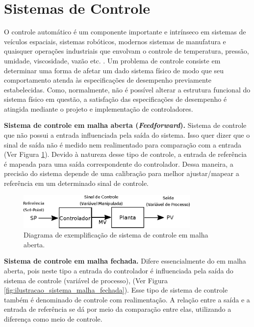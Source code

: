 \section{Sistemas de Controle}
\label{sec:sistema_controle}
O controle automático é um componente importante e intrínseco em sistemas de veículos espaciais, sistemas robóticos, modernos sistemas de manufatura e quaisquer operações industriais que envolvam o controle de temperatura, pressão, umidade, viscosidade, vazão etc. \cite{ogata2011engenharia}. Um problema de controle consiste em determinar uma forma de afetar um dado sistema físico de modo que seu comportamento atenda às especificações de desempenho previamente estabelecidas. Como, normalmente, não é possível alterar a estrutura funcional do sistema físico em questão, a satisfação das especificações de desempenho é atingida mediante o projeto e implementação de controladores.


\textbf{Sistema de controle em malha aberta (\emph{Feedforward}).} Sistema de controle que não possui a entrada influenciada pela saída do sistema. Isso quer dizer que o sinal de saída não é medido nem realimentado para comparação com a entrada (Ver Figura \ref{fig:ilustracao_sistema_malha_aberta}). Devido à natureza desse tipo de controle, a entrada de referência é mapeada para uma saída correspondente do controlador. Dessa maneira, a precisão do sistema depende de uma calibração para melhor ajustar/mapear a referência em um determinado sinal de controle.

\begin{figure}[H]
    \centering
    \includegraphics[width=0.8\textwidth]{figuras/ilustracoes/diagrama_sistema_malha_aberta.eps}
    \caption{Diagrama de exemplificação de sistema de controle em malha aberta.}
    \label{fig:ilustracao_sistema_malha_aberta}
\end{figure}

\textbf{Sistema de controle em malha fechada.} Difere essencialmente do em malha aberta, pois neste tipo a entrada do controlador é influenciada pela saída do sistema de controle (variável de processo), (Ver Figura \ref{fig:ilustracao_sistema_malha_fechada}). Esse tipo de sistema de controle também é denominado de controle com realimentação. A relação entre a saída e a entrada de referência se dá por meio da comparação entre elas, utilizando a diferença como meio de controle.

